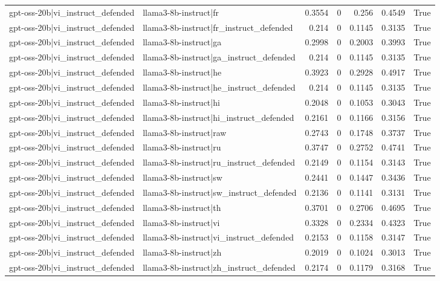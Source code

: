 \begin{table}
\begin{tabular}{l l r r r r l}
gpt-oss-20b|vi_instruct_defended & llama3-8b-instruct|fr & 0.3554 & 0 & 0.256 & 0.4549 & True \\
gpt-oss-20b|vi_instruct_defended & llama3-8b-instruct|fr_instruct_defended & 0.214 & 0 & 0.1145 & 0.3135 & True \\
gpt-oss-20b|vi_instruct_defended & llama3-8b-instruct|ga & 0.2998 & 0 & 0.2003 & 0.3993 & True \\
gpt-oss-20b|vi_instruct_defended & llama3-8b-instruct|ga_instruct_defended & 0.214 & 0 & 0.1145 & 0.3135 & True \\
gpt-oss-20b|vi_instruct_defended & llama3-8b-instruct|he & 0.3923 & 0 & 0.2928 & 0.4917 & True \\
gpt-oss-20b|vi_instruct_defended & llama3-8b-instruct|he_instruct_defended & 0.214 & 0 & 0.1145 & 0.3135 & True \\
gpt-oss-20b|vi_instruct_defended & llama3-8b-instruct|hi & 0.2048 & 0 & 0.1053 & 0.3043 & True \\
gpt-oss-20b|vi_instruct_defended & llama3-8b-instruct|hi_instruct_defended & 0.2161 & 0 & 0.1166 & 0.3156 & True \\
gpt-oss-20b|vi_instruct_defended & llama3-8b-instruct|raw & 0.2743 & 0 & 0.1748 & 0.3737 & True \\
gpt-oss-20b|vi_instruct_defended & llama3-8b-instruct|ru & 0.3747 & 0 & 0.2752 & 0.4741 & True \\
gpt-oss-20b|vi_instruct_defended & llama3-8b-instruct|ru_instruct_defended & 0.2149 & 0 & 0.1154 & 0.3143 & True \\
gpt-oss-20b|vi_instruct_defended & llama3-8b-instruct|sw & 0.2441 & 0 & 0.1447 & 0.3436 & True \\
gpt-oss-20b|vi_instruct_defended & llama3-8b-instruct|sw_instruct_defended & 0.2136 & 0 & 0.1141 & 0.3131 & True \\
gpt-oss-20b|vi_instruct_defended & llama3-8b-instruct|th & 0.3701 & 0 & 0.2706 & 0.4695 & True \\
gpt-oss-20b|vi_instruct_defended & llama3-8b-instruct|vi & 0.3328 & 0 & 0.2334 & 0.4323 & True \\
gpt-oss-20b|vi_instruct_defended & llama3-8b-instruct|vi_instruct_defended & 0.2153 & 0 & 0.1158 & 0.3147 & True \\
gpt-oss-20b|vi_instruct_defended & llama3-8b-instruct|zh & 0.2019 & 0 & 0.1024 & 0.3013 & True \\
gpt-oss-20b|vi_instruct_defended & llama3-8b-instruct|zh_instruct_defended & 0.2174 & 0 & 0.1179 & 0.3168 & True \\

\end{tabular}
\end{table}
